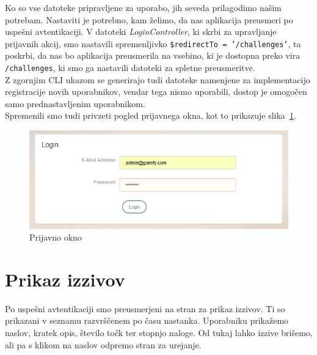 \documentclass[a4paper, 12pt]{book}
\begin{document}
Ko so vse datoteke pripravljene za uporabo, jih seveda prilagodimo našim potrebam. Nastaviti je potrebno, kam želimo, da nas aplikacija preusmeri po uspešni avtentikaciji. V datoteki \textit{LoginController}, ki skrbi za upravljanje prijavnih akcij, smo nastavili spremenljivko \texttt{\$redirectTo = '/challenges'}, ta poskrbi, da nas bo aplikacija preusmerila na vsebino, ki je dostopna preko vira \texttt{/challenges}, ki smo ga nastavili datoteki za spletne preusmeritve.\\Z zgornjim CLI ukazom se generirajo tudi datoteke namenjene za implementacijo registracije novih uporabnikov, vendar tega nismo uporabili, dostop je omogočen samo prednastavljenim uporabnikom.\\Spremenili smo tudi privzeti pogled prijavnega okna, kot to prikazuje slika~\ref{portal_login}.
\begin{figure}[H]
\centering
\includegraphics[height=0.4\textwidth]{slike/portal_login}
\caption{Prijavno okno}\label{portal_login}
\end{figure}
\newpage
\section{Prikaz izzivov}
Po uspešni avtentikaciji smo preusmerjeni na stran za prikaz izzivov. Ti so prikazani v seznamu razvrščenem po času nastanka. Uporabniku prikažemo naslov, kratek opis, število točk ter stopnjo naloge. Od tukaj lahko izzive brišemo, ali pa s klikom na naslov odpremo stran za urejanje.
\end{document}
